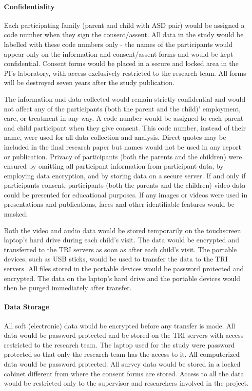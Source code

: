 \paragraph{Confidentiality}
Each participating family (parent and child with ASD pair) would be assigned a code number when they sign the consent/assent. All data in the study would be labelled with these code numbers only - the names of the participants would appear only on the information and consent/assent forms and would be kept confidential. Consent forms would be placed in a secure and locked area in the PI's laboratory, with access exclusively restricted to the research team. All forms will be destroyed seven years after the study publication. 

The information and data collected would remain strictly confidential and would not affect any of the participants (both the parent and the child)' employment, care, or treatment in any way. A code number would be assigned to each parent and child participant when they give consent. This code number, instead of their name, were used for all data collection and analysis. Direct quotes may be included in the final research paper but names would not be used in any report or publication. Privacy of participants (both the parents and the children) were ensured by omitting all participant information from participant data, by employing data encryption, and by storing data on a secure server.  If and only if participants consent, participants (both the parents and the children) video data could be presented for educational purposes.  If any images or videos were used in presentations and publications, faces and other identifiable features would be masked.

Both the video and audio data would be stored temporarily on the touchscreen laptop's hard drive during each child's visit. The data would be encrypted and transferred to the TRI servers as soon as after each child's visit. The portable devices, such as USB sticks, would be used to transfer the data to the TRI servers. All files stored in the portable devices would be password protected and encrypted. The data on the laptop's hard drive and the portable devices would then be purged immediately after transfer. 

\paragraph{Data Storage}
All soft (electronic) data would be encrypted before any transfer is made. All data would be password protected and be stored on the TRI servers with access restricted to the research team. The laptop used for the study were password protected so that only the research team has the access to it. All computerized data would be password protected. All survey data would be stored in a locked cabinet different from where the consent forms are stored. Access to all the data would be restricted only to the supervisor and researchers involved in the project. 

